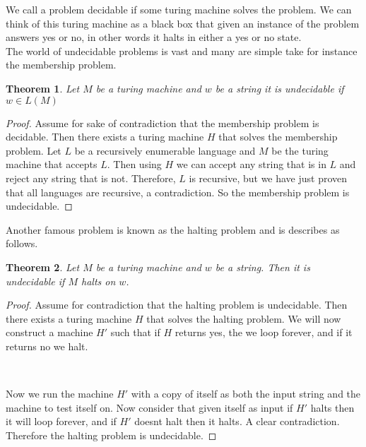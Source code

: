 \documentclass[11pt]{exam}
\newtheorem{theorem}{Theorem}[section]
\begin{document}
We call a problem decidable if some turing machine solves the problem. We can think of this turing machine as a black box that given an instance of the problem answers yes or no, in other words it halts in either a yes or no state.\\

The world of undecidable problems is vast and many are simple take for instance the membership problem.

\begin{theorem}
Let $M$ be a turing machine and $w$ be a string it is undecidable if $w \in L(M)$
\end{theorem}

\begin{proof}
Assume for sake of contradiction that the membership problem is decidable. Then there exists a turing machine $H$ that solves the membership problem. Let $L$ be a recursively enumerable language and $M$ be the turing machine that accepts $L$. Then using $H$ we can accept any string that is in $L$ and reject any string that is not. Therefore, $L$ is recursive, but we have just proven that all languages are recursive, a contradiction. So the membership problem is undecidable.
\end{proof}

Another famous problem is known as the halting problem and is describes as follows.

\begin{theorem}
Let $M$ be a turing machine and $w$ be a string. Then it is undecidable if $M$ halts on $w$.
\end{theorem}

\begin{proof}
Assume for contradiction that the halting problem is undecidable.  Then there exists a turing machine $H$ that solves the halting problem. We will now construct a machine $H'$ such that if $H$ returns yes, the we loop forever, and if it returns no we halt.

\begin{center}
\\
\end{center}

Now we run the machine $H'$ with a copy of itself as both the input string and the machine to test itself on. Now consider that given itself as input if $H'$ halts then it will loop forever, and if $H'$ doesnt halt then it halts. A clear contradiction. Therefore the halting problem is undecidable.
\end{proof}
\end{document}
